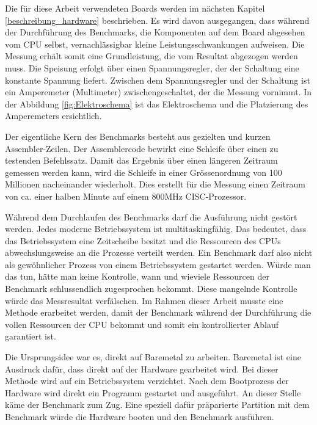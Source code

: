 Die für diese Arbeit verwendeten Boards werden im nächsten Kapitel \autoref{beschreibung_hardware} beschrieben. Es wird davon ausgegangen, dass während der Durchführung des Benchmarks, die Komponenten auf dem Board abgesehen vom CPU selbst, vernachlässigbar kleine Leistungsschwankungen aufweisen. Die Messung erhält somit eine Grundleistung, die vom Resultat abgezogen werden muss. Die Speisung erfolgt über einen Spannungsregler, der der Schaltung eine konstante Spannung liefert. Zwischen dem Spannungsregler und der Schaltung ist ein Amperemeter (Multimeter) zwischengeschaltet, der die Messung vornimmt. In der Abbildung \ref{fig:Elektroschema} ist das Elektroschema und die Platzierung des Amperemeters ersichtlich.
\par
Der eigentliche Kern des Benchmarks besteht aus gezielten und kurzen Assembler-Zeilen. Der Assemblercode bewirkt eine Schleife über einen zu testenden Befehlssatz. Damit das Ergebnis über einen längeren Zeitraum gemessen werden kann, wird die Schleife in einer Grössenordnung von 100 Millionen nacheinander wiederholt. Dies erstellt für die Messung einen Zeitraum von ca. einer halben Minute auf einem 800MHz CISC-Prozessor.
\par
Während dem Durchlaufen des Benchmarks darf die Ausführung nicht gestört werden. Jedes moderne Betriebssystem ist multitaskingfähig. Das bedeutet, dass das Betriebssystem eine Zeitscheibe besitzt und die Ressourcen des CPUs abwechslungsweise an die Prozesse verteilt werden. Ein Benchmark darf also nicht als gewöhnlicher Prozess von einem Betriebssystem gestartet werden. Würde man das tun, hätte man keine Kontrolle, wann und wieviele Ressourcen der Benchmark schlussendlich zugesprochen bekommt. Diese mangelnde Kontrolle würde das Messresultat verfälschen. Im Rahmen dieser Arbeit musste eine Methode erarbeitet werden, damit der Benchmark während der Durchführung die vollen Ressourcen der CPU bekommt und somit ein kontrollierter Ablauf garantiert ist.
\par
Die Ursprungsidee war es, direkt auf Baremetal zu arbeiten. Baremetal ist eine Ausdruck dafür, dass direkt auf der Hardware gearbeitet wird. Bei dieser Methode wird auf ein Betriebssystem verzichtet. Nach dem Bootprozess der Hardware wird direkt ein Programm gestartet und ausgeführt. An dieser Stelle käme der Benchmark zum Zug. Eine speziell dafür präparierte Partition mit dem Benchmark würde die Hardware booten und den Benchmark ausführen.
\par
